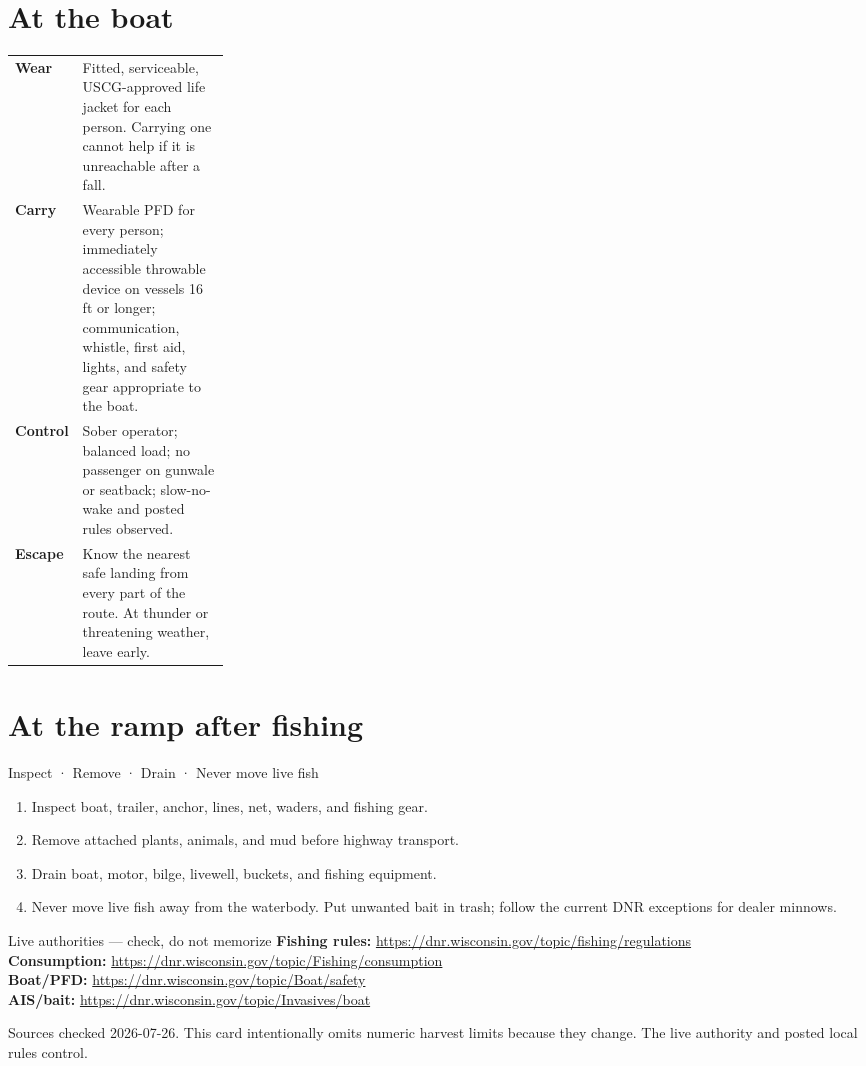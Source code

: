 \section{At the boat}
\begin{tabularx}{\linewidth}{@{}p{0.25\linewidth}X@{}}
\toprule
\textbf{Wear} & Fitted, serviceable, USCG-approved life jacket for each person.
Carrying one cannot help if it is unreachable after a fall.\\
\textbf{Carry} & Wearable PFD for every person; immediately accessible
throwable device on vessels 16 ft or longer; communication, whistle, first aid,
lights, and safety gear appropriate to the boat.\\
\textbf{Control} & Sober operator; balanced load; no passenger on gunwale or
seatback; slow-no-wake and posted rules observed.\\
\textbf{Escape} & Know the nearest safe landing from every part of the route.
At thunder or threatening weather, leave early.\\
\bottomrule
\end{tabularx}

\section{At the ramp after fishing}
\begin{telospanel}{Inspect · Remove · Drain · Never move live fish}
\begin{enumerate}
\item Inspect boat, trailer, anchor, lines, net, waders, and fishing gear.
\item Remove attached plants, animals, and mud before highway transport.
\item Drain boat, motor, bilge, livewell, buckets, and fishing equipment.
\item Never move live fish away from the waterbody. Put unwanted bait in trash;
follow the current DNR exceptions for dealer minnows.
\end{enumerate}
\end{telospanel}

\begin{teloscard}{Live authorities — check, do not memorize}
\small
\textbf{Fishing rules:} \url{https://dnr.wisconsin.gov/topic/fishing/regulations}\\
\textbf{Consumption:} \url{https://dnr.wisconsin.gov/topic/Fishing/consumption}\\
\textbf{Boat/PFD:} \url{https://dnr.wisconsin.gov/topic/Boat/safety}\\
\textbf{AIS/bait:} \url{https://dnr.wisconsin.gov/topic/Invasives/boat}
\end{teloscard}

{\footnotesize Sources checked 2026-07-26. This card intentionally omits
numeric harvest limits because they change. The live authority and posted
local rules control.}


